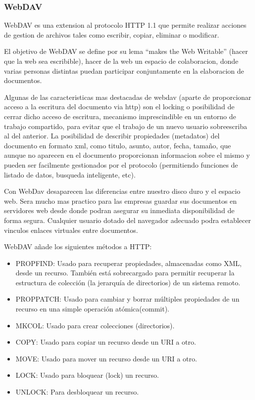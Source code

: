 \subsubsection*{WebDAV}

WebDAV es una extension al protocolo HTTP 1.1 que permite realizar acciones de gestion de archivos tales como escribir, copiar, eliminar o modificar.

El objetivo de WebDAV se define por su lema ``makes the Web Writable'' (hacer que la web sea escribible), hacer de la web un espacio de colaboracion, donde varias personas distintas puedan participar conjuntamente en la elaboracion de documentos.

Algunas de las caracteristicas mas destacadas de webdav (aparte de proporcionar acceso a la escritura del documento via http) son el locking o posibilidad de cerrar dicho acceso de escritura, mecanismo imprescindible en un entorno de trabajo compartido, para evitar que el trabajo de un nuevo usuario sobreescriba al del anterior. La posibilidad de describir propiedades (metadatos) del documento en formato xml, como titulo, asunto, autor, fecha, tamaño, que aunque no aparecen en el documento proporcionan informacion sobre el mismo y pueden ser facilmente gestionados por el protocolo (permitiendo funciones de listado de datos, busqueda inteligente, etc).

Con WebDav desaparecen las diferencias entre nuestro disco duro y el espacio web. Sera mucho mas practico para las empresas guardar sus documentos en servidores web desde donde podran asegurar su inmediata disponibilidad de forma segura. Cualquier usuario dotado del navegador adecuado podra establecer vinculos enlaces virtuales entre documentos.

WebDAV añade los siguientes métodos a HTTP:

\begin{itemize}

	\item PROPFIND: Usado para recuperar propiedades, almacenadas como XML, desde un recurso. También está sobrecargado para permitir recuperar la estructura de colección (la jerarquía de directorios) de un sistema remoto.
	
	\item PROPPATCH: Usado para cambiar y borrar múltiples propiedades de un recurso en una simple operación atómica(commit).
	
	\item MKCOL: Usado para crear colecciones (directorios).
	
	\item COPY: Usado para copiar un recurso desde un URI a otro.
	
	\item MOVE: Usado para mover un recurso desde un URI a otro.
	
	\item LOCK: Usado para bloquear (lock) un recurso.
	
	\item UNLOCK: Para desbloquear un recurso.

\end{itemize}

